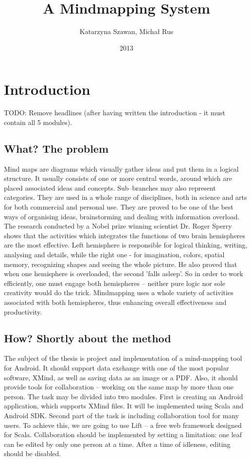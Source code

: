 \documentclass[american]{bsc}
\title{A Mindmapping System}
\author{Katarzyna Szawan, Michał Rus}
\date{2013}
\begin{document}
\maketitle

\chapter{Introduction}
\label{chap:introduction}
TODO: Remove headlines (after having written the introduction - it must contain all 5 modules). 
\section{What? The problem}
\label{sec:what}
Mind maps are diagrams which visually gather ideas and put them in a logical structure. It usually consists of one or more central words, around which are placed associated ideas and concepts. Sub--branches may also represent categories.  They are used in a whole range of disciplines, both in science and arts for both commercial and personal use. They are proved to be one of the best ways of organising ideas, brainstorming and dealing with information overload. The research conducted by a Nobel prize winning scientist Dr. Roger Sperry shows that the activities which integrates the functions of two brain hemispheres are the most effective. Left hemisphere is responsible for logical thinking, writing, analysing and details, while the right one - for imagination, colors, spatial memory, recognizing shapes and seeing the whole picture. He also proved that when one hemisphere is overloaded, the second 'falls asleep'. So in order to work efficiently, one must engage both hemispheres -- neither pure logic nor sole creativity would do the trick. Mindmapping uses a whole variety of activities associated with both hemispheres, thus enhancing overall effectiveness and productivity. 

\section{How? Shortly about the method}
\label{sec:how}
The subject of the thesis is project and implementation of a mind-mapping tool for Android. It should support data exchange with one of the most popular software, XMind, as well as saving data as an image or a PDF. Also, it should provide tools for collaboration -- working on the same map by more than one person. The task may be divided into two modules. First is creating an Android application, which supports XMind files. It will be implemented using Scala and Android SDK. Second part of the task is including collaboration tool for many users. To achieve this, we are going to use Lift -- a free web framework  designed for Scala. Collaboration should be implemented by setting a limitation: one leaf can be edited by only one person at a time. After a time of idleness, editing should be disabled.
\end{document}

